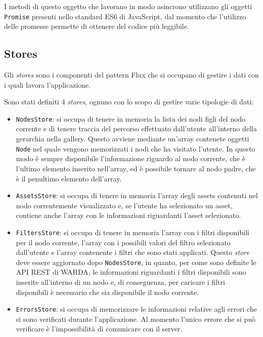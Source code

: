 I metodi di questo oggetto che lavorano in modo asincrono utilizzano gli oggetti \texttt{Promise} presenti nello standard ES6 di JavaScript, dal momento che l'utilizzo delle promesse permette di ottenere del codice più leggibile.

\subsection{Stores}

Gli \textit{stores} sono i componenti del pattern Flux che si occupano di gestire i dati con i quali lavora l'applicazione. 

Sono stati definiti 4 \textit{stores}, ognuno con lo scopo di gestire varie tipologie di dati:
\begin{itemize}
\item \texttt{NodesStore}: si occupa di tenere in memoria la lista dei nodi figli del nodo corrente e di tenere traccia del percorso effettuato dall'utente all'interno della gerarchia nella gallery. Questo avviene mediante un'array contenete oggetti \texttt{Node} nel quale vengono memorizzati i nodi che ha visitato l'utente. In questo modo è sempre disponibile l'informazione riguardo al nodo corrente, che è l'ultimo elemento inserito nell'array, ed è possibile tornare al nodo padre, che è il penultimo elemento dell'array.
\item \texttt{AssetsStore}: si occupa di tenere in memoria l'array degli assets contenuti nel nodo correntemente visualizzato e, se l'utente ha selezionato un asset, contiene anche l'array con le informazioni riguardanti l'asset selezionato.
\item \texttt{FiltersStore}: si occupa di tenere in memoria l'array con i filtri disponibili per il nodo corrente, l'array con i possibili valori del filtro selezionato dall'utente e l'array contenente i filtri che sono stati applicati. Questo \textit{store} deve essere aggiornato dopo \texttt{NodesStore}, in quanto, per come sono definite le API REST di WARDA, le informazioni riguardanti i filtri disponibili sono inserite all'interno di un nodo e, di conseguenza, per caricare i filtri disponibili è necessario che sia disponibile il nodo corrente.
\item \texttt{ErrorsStore}: si occupa di memorizzare le informazioni relative agli errori che si sono verificati durante l'applicazione. Al momento l'unico errore che si può verificare è l'impossibilità di comunicare con il server.
\end{itemize}

